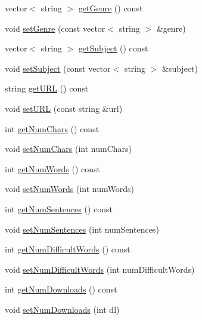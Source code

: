 \begin{DoxyCompactItemize}
\item 
vector$<$ string $>$ \hyperlink{classbridges_1_1dataset_1_1_gutenberg_book_abee0e92b7936373301d01c67d9eb14e2}{get\+Genre} () const
\item 
void \hyperlink{classbridges_1_1dataset_1_1_gutenberg_book_a2b0787215311029297ffab97c56d2eaa}{set\+Genre} (const vector$<$ string $>$ \&genre)
\item 
vector$<$ string $>$ \hyperlink{classbridges_1_1dataset_1_1_gutenberg_book_ad84630cbd83ed0eca40e5008d43cf7d6}{get\+Subject} () const
\item 
void \hyperlink{classbridges_1_1dataset_1_1_gutenberg_book_a88a49679dcbb7992c9c526f4d6f3049b}{set\+Subject} (const vector$<$ string $>$ \&subject)
\item 
string \hyperlink{classbridges_1_1dataset_1_1_gutenberg_book_a74893ce58a9bc24d41d51c14c0f7e816}{get\+U\+RL} () const
\item 
void \hyperlink{classbridges_1_1dataset_1_1_gutenberg_book_aaa548eeb0e8512f95e3e0ea2bf6d7e9f}{set\+U\+RL} (const string \&url)
\item 
int \hyperlink{classbridges_1_1dataset_1_1_gutenberg_book_a79b1515db41bce12b1819af5d1c90006}{get\+Num\+Chars} () const
\item 
void \hyperlink{classbridges_1_1dataset_1_1_gutenberg_book_a5e4ccbb36137567c4b28accf83300920}{set\+Num\+Chars} (int num\+Chars)
\item 
int \hyperlink{classbridges_1_1dataset_1_1_gutenberg_book_a5a2042c0a79338f12192a47d093d16fd}{get\+Num\+Words} () const
\item 
void \hyperlink{classbridges_1_1dataset_1_1_gutenberg_book_a4ff46e5a2873feec4c0e6b773320bed5}{set\+Num\+Words} (int num\+Words)
\item 
int \hyperlink{classbridges_1_1dataset_1_1_gutenberg_book_ae1a96947459fbc978e2bb4b3f7e767a0}{get\+Num\+Sentences} () const
\item 
void \hyperlink{classbridges_1_1dataset_1_1_gutenberg_book_a6b02a1584f47b34389ce2c9fe71129c6}{set\+Num\+Sentences} (int num\+Sentences)
\item 
int \hyperlink{classbridges_1_1dataset_1_1_gutenberg_book_a7dbcb4a45d2c5d607b7b5231eb4e970b}{get\+Num\+Difficult\+Words} () const
\item 
void \hyperlink{classbridges_1_1dataset_1_1_gutenberg_book_a1cf0c2c558c414b1f5cfc04d00ae9128}{set\+Num\+Difficult\+Words} (int num\+Difficult\+Words)
\item 
int \hyperlink{classbridges_1_1dataset_1_1_gutenberg_book_a41bb0239e0b3f98848b2051401ee3a28}{get\+Num\+Downloads} () const
\item 
void \hyperlink{classbridges_1_1dataset_1_1_gutenberg_book_aacf716498f942400c65fdc3068008f61}{set\+Num\+Downloads} (int dl)
\end{DoxyCompactItemize}


